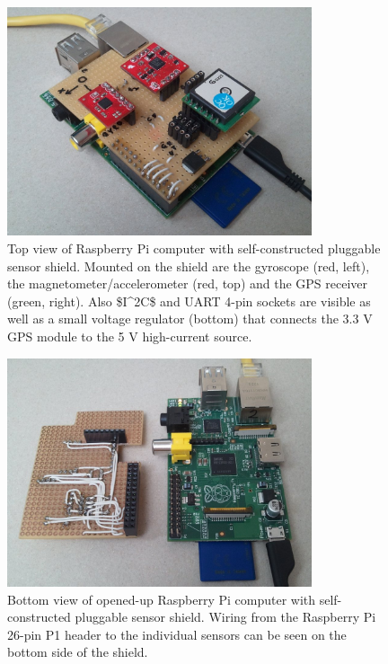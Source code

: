 \begin{figure}[h!]
\centering
\includegraphics[width=0.8\textwidth]{figures/raspberry-sensors-top.jpg}
\caption[Top view of Raspberry Pi computer with sensor shield]{Top view of Raspberry Pi computer with self-constructed pluggable sensor shield. Mounted on the shield are the gyroscope (red, left), the magnetometer/accelerometer (red, top) and the \ac{GPS} receiver (green, right). Also \ac{$I^2C$} and \ac{UART} 4-pin sockets are visible as well as a small voltage regulator (bottom) that connects the 3.3 V \ac{GPS} module to the 5 V high-current source.}
\label{fig:raspberry-sensors-top}
\end{figure}

\pagebreak

\begin{figure}[h!]
\centering
\includegraphics[width=0.8\textwidth]{figures/raspberry-sensors-open.jpg}
\caption[Bottom view of opened-up Raspberry Pi computer with sensor shield]{Bottom view of opened-up Raspberry Pi computer with self-constructed pluggable sensor shield. Wiring from the Raspberry Pi 26-pin P1 header to the individual sensors can be seen on the bottom side of the shield.}
\label{fig:raspberry-sensors-open}
\vspace{-1.0em}
\end{figure}

